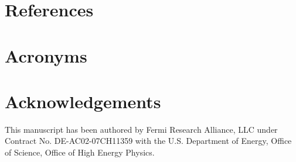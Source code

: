 \documentclass[DM,authoryear,toc]{lsstdoc}
\begin{document}
\appendix
\section{References} \label{sec:bib}
\renewcommand{\refname}{} %


\section{Acronyms} \label{sec:acronyms}


\section{Acknowledgements} \label{sec:acknowledgement}

This manuscript has been authored by Fermi Research Alliance, LLC under Contract No. DE-AC02-07CH11359 with the U.S. Department of Energy, Office of Science, Office of High Energy Physics.
\end{document}
